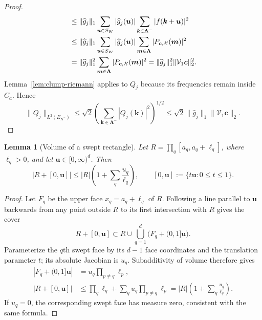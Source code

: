 \documentclass[11pt]{article}
\newtheorem{lemma}{Lemma}
\newcommand{\V}{\mathcal V}
\newcommand{\X}{\mathcal X}
\begin{document}
\begin{proof}
\begin{align}
&\le\|\widehat g_j\|_1\sum_{\bm u\in S_W}|\widehat g_j(\bm u)|\sum_{\bm k\in\bm\Lambda^-}|f(\bm k+\bm u)|^2\notag\\
&\le\|\widehat g_j\|_1\sum_{\bm u\in S_W}|\widehat g_j(\bm u)|\sum_{\bm m\in\bm\Lambda}|P_{\bm c,\X}(\bm m)|^2\notag\\
&=\|\widehat g_j\|_1^2\sum_{\bm m\in\bm\Lambda}|P_{\bm c,\X}(\bm m)|^2=\|\widehat g_j\|_1^2\|\V_1\bm c\|_2^2.
\end{align}
Lemma~\ref{lem:clump-riemann} applies to $Q_j$ because its frequencies remain inside $C_a$. Hence
\[
\|Q_j\|_{L^2(E_{\bm\Lambda^-})}\le\sqrt2\left(\sum_{\bm k\in\bm\Lambda^-}|Q_j(\bm k)|^2\right)^{1/2}\le\sqrt2\|\widehat g_j\|_1\|\V_1\bm c\|_2.
\]
\end{proof}

\begin{lemma}[Volume of a swept rectangle]\label{lem:swept-volume}
Let $R=\prod_q[a_q,a_q+\ell_q]$, where $\ell_q>0$, and let $\bm u\in[0,\infty)^d$. Then
\begin{equation}\label{eq:swept-volume}
\left|R+[0,\bm u]\right|\le|R|\left(1+\sum_q\frac{u_q}{\ell_q}\right),\qquad [0,\bm u]:=\{t\bm u:0\le t\le1\}.
\end{equation}
\end{lemma}
\begin{proof}
Let $F_q$ be the upper face $x_q=a_q+\ell_q$ of $R$. Following a line parallel to $\bm u$ backwards from any point outside $R$ to its first intersection with $R$ gives the cover
\[
R+[0,\bm u]\subset R\cup\bigcup_{q=1}^d\bigl(F_q+(0,1]\bm u\bigr).
\]
Parameterize the $q$th swept face by its $d-1$ face coordinates and the translation parameter $t$; its absolute Jacobian is $u_q$. Subadditivity of volume therefore gives
\begin{align*}
\left|F_q+(0,1]\bm u\right|&=u_q\prod_{p\ne q}\ell_p,\\
\left|R+[0,\bm u]\right|&\le\prod_q\ell_q+\sum_q u_q\prod_{p\ne q}\ell_p=|R|\left(1+\sum_q\frac{u_q}{\ell_q}\right).
\end{align*}
If $u_q=0$, the corresponding swept face has measure zero, consistent with the same formula.
\end{proof}
\end{document}
